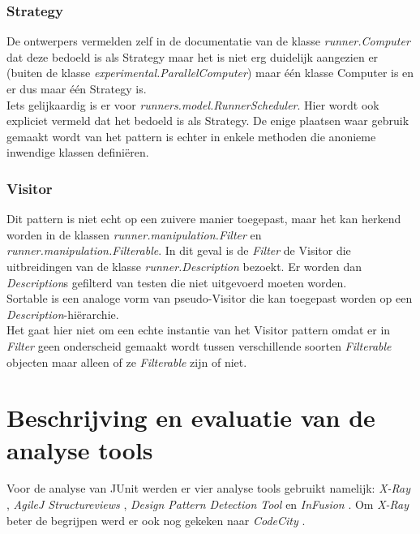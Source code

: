\documentclass[i1]{oss}
\begin{document}
\subsubsection{Strategy}
De ontwerpers vermelden zelf in de documentatie van de klasse \emph{runner.Computer} dat deze bedoeld is als Strategy maar het is niet erg duidelijk aangezien er (buiten de klasse \emph{experimental.ParallelComputer}) maar \'e\'en klasse Computer is en er dus maar \'e\'en Strategy is.
\\
Iets gelijkaardig is er voor \emph{runners.model.RunnerScheduler}. Hier wordt ook expliciet vermeld dat het bedoeld is als Strategy. De enige plaatsen waar gebruik gemaakt wordt van het pattern is echter in enkele methoden die anonieme inwendige klassen defini\"eren.


\subsubsection{Visitor}
Dit pattern is niet echt op een zuivere manier toegepast, maar het kan herkend worden in de klassen \emph{runner.manipulation.Filter} en \emph{runner.manipulation.Filterable}. 
In dit geval is de \emph{Filter} de Visitor die uitbreidingen van de klasse \emph{runner.Description} bezoekt. 
Er worden dan \emph{Description}s gefilterd van testen die niet uitgevoerd moeten worden. 
\\
Sortable is een analoge vorm van pseudo-Visitor die kan toegepast worden op een \emph{Description}-hi\"erarchie.
\\
Het gaat hier niet om een echte instantie van het Visitor pattern omdat er in \emph{Filter} geen onderscheid gemaakt wordt tussen verschillende soorten \emph{Filterable} objecten maar alleen of ze \emph{Filterable} zijn of niet.



%
%

\section{Beschrijving en evaluatie van de analyse tools}

Voor de analyse van JUnit werden er vier analyse tools gebruikt namelijk: \emph{X-Ray} \cite{X-Ray}, \emph{AgileJ Structureviews} \cite{AgileJ Structureviews} , \emph{Design Pattern Detection Tool} \cite{Design Pattern Detection Tool} en \emph{InFusion} \cite{Infusion}. Om \emph{X-Ray} beter de begrijpen werd er ook nog gekeken naar \emph{CodeCity} \cite{CodeCity}.
\end{document}
